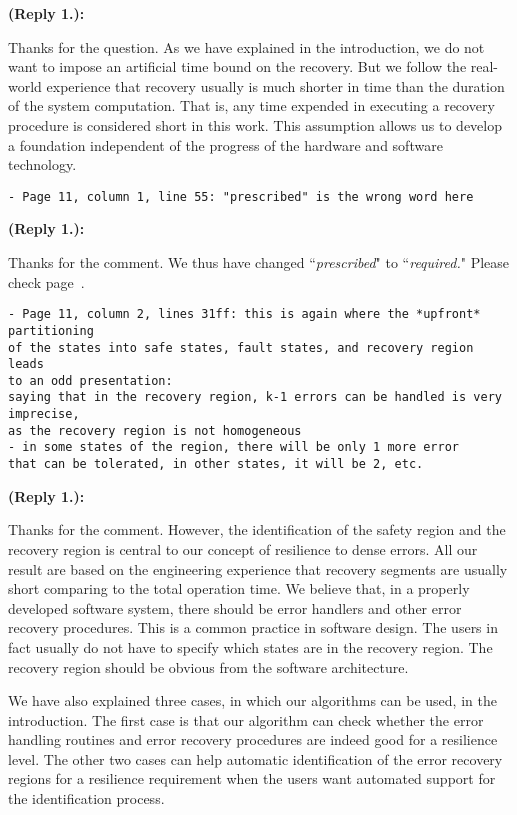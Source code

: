 \documentclass[times,10pt,twocolumn]{article}
\newcounter{cabbage0}
\newcounter{cabbage1}
\newcounter{cabbage2}
\newcounter{cabbage3}
\newcounter{bean0}
\newcounter{bean1}
\newcounter{bean2}
\newcounter{bean3}
\newcounter{bean4}
\newcounter{bean5}
\newcounter{bean6}
\newenvironment{reply1}{\begin{list}{\bf (Reply 1.\arabic{bean1}):} 
        {\usecounter{bean1}\setcounter{bean1}{\value{cabbage1}} \item \setcounter{cabbage1}{\value{bean1}} 
        }
}{\end{list}}
\begin{document}
\begin{reply1} 
Thanks for the question. 
As we have explained in the introduction, we do not want to 
impose an artificial time bound on the recovery.  
But we follow the real-world experience that recovery usually 
is much shorter in time than the duration of the system computation.  
That is, any time expended in executing a recovery procedure 
is considered short in this work. 
This assumption allows us to develop a foundation independent of the progress of 
the hardware and software technology.  
\end{reply1}
\begin{verbatim} 
- Page 11, column 1, line 55: "prescribed" is the wrong word here
\end{verbatim}
\begin{reply1} 
Thanks for the comment. 
We thus have changed ``{\em prescribed}" to ``{\em required.}"
Please check page~\pageref{reply1.prescribed.2.required}.  
\end{reply1}
\begin{verbatim} 
- Page 11, column 2, lines 31ff: this is again where the *upfront* partitioning 
of the states into safe states, fault states, and recovery region leads 
to an odd presentation: 
saying that in the recovery region, k-1 errors can be handled is very imprecise, 
as the recovery region is not homogeneous 
- in some states of the region, there will be only 1 more error 
that can be tolerated, in other states, it will be 2, etc.
\end{verbatim}
\begin{reply1} 
\label{reply1m.safety.region}
Thanks for the comment. 
However, the identification of the safety region and the recovery region is 
central to our concept of resilience to dense errors. 
All our result are based on the engineering experience that 
recovery segments are usually short comparing to the total operation time. 
We believe that, in a properly developed software system, 
there should be error handlers and other error recovery procedures. 
This is a common practice in software design. 
The users in fact usually do not have to specify which states are in the recovery 
region.  
The recovery region should be obvious from the software architecture. 

We have also explained three cases, in which our algorithms can be used, in the 
introduction.  
The first case is that our algorithm can check whether the error handling routines 
and error recovery procedures are indeed good for a resilience level. 
The other two cases can help automatic identification of the error recovery 
regions for a resilience requirement when the 
users want automated support for the identification process.  
\end{reply1}
\end{document}

